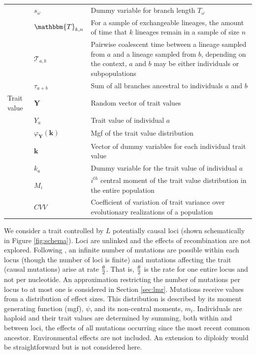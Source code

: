 \begin{table}
\begin{tabular}{l l l}
                                         & $s_\omega$ & Dummy variable for branch length $T_{\omega}$ \\
                                         & $\mathbbm{T}_{k,n}$ & \multicolumn{1}{p{10cm}}{For a sample of exchangeable lineages, the amount of time that $k$ lineages remain in a sample of size $n$}\\
                                         & $\mathcal{T}_{a,b}$ & \multicolumn{1}{p{10cm}}{Pairwise coalescent time between a lineage sampled from $a$ and a lineage sampled from $b$, depending on the context, $a$ and $b$ may be either individuals or subpopulations}\\
                                         & $\tau_{a+b}$ & Sum of all branches ancestral to individuals $a$ and $b$\\
    Trait value & $\mathbf{Y}$ & Random vector of trait values \\
                                         & $Y_a$ & Trait value of individual $a$\\
                                         & $\varphi_{\mathbf{Y}}(\mathbf{k})$ & Mgf of the trait value distribution \\
                                         & $\mathbf{k}$ & \multicolumn{1}{p{10cm}}{Vector of dummy variables for each individual trait value}\\
                                         & $k_a$ & Dummy variable for the trait value of individual $a$\\
                                         & $M_i$ & \multicolumn{1}{p{10cm}}{$i^{th}$ central moment of the trait value distribution in the entire population}\\
                                         & $CVV$ & \multicolumn{1}{p{10cm}}{Coefficient of variation of trait variance over evolutionary realizations of a population}\\
    \hline
  \end{tabular}
  \label{notation}
\end{table}

We consider a trait controlled by $L$ potentially causal loci (shown
schematically in Figure \ref{fig:schema}). Loci are unlinked and the effects of
recombination are not explored. Following \citet{Kimura1969}, an infinite number
of mutations are possible within each locus (though the number of loci is
finite) and mutations affecting the trait (causal mutations) arise at rate $\frac{\theta}{2}$.
That is, $\frac{\theta}{2}$ is the rate for one entire locus and not per nucleotide. An
approximation restricting the number of mutations per locus to at most one is
considered in Section \ref{sec:lmr}. Mutations receive values from a
distribution of effect sizes. This distribution is described by its moment
generating function (mgf), $\psi$, and its non-central moments, $m_i$.
Individuals are haploid and their trait values are determined by summing, both
within and between loci, the effects of all mutations occurring since the most
recent common ancestor. Environmental effects are not included. An extension to
diploidy would be straightforward but is not considered here.

